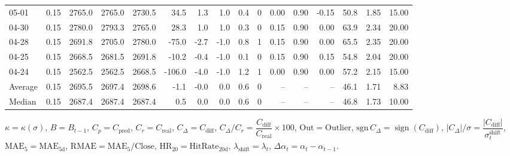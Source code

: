 \begin{threeparttable}
{\begin{tabular}{lrrrrrrrrrrrrrrr}
  05-01 &     0.15 & 2765.0 & 2765.0 & 2730.5 &       34.5 &            1.3 &                      1.0 &                 0.4 &              0 &       0.00 &      0.90 &          -0.15 &             50.8 &            1.85 &                  15.00 \\
  04-30 &     0.15 & 2780.0 & 2793.3 & 2765.0 &       28.3 &            1.0 &                      1.0 &                 0.3 &              0 &       0.15 &      0.90 &           0.00 &             63.9 &            2.34 &                  20.00 \\
  04-28 &     0.15 & 2691.8 & 2705.0 & 2780.0 &      -75.0 &           -2.7 &                     -1.0 &                 0.8 &              1 &       0.15 &      0.90 &           0.00 &             65.5 &            2.35 &                  20.00 \\
  04-25 &     0.15 & 2668.5 & 2681.5 & 2691.8 &      -10.2 &           -0.4 &                     -1.0 &                 0.1 &              0 &       0.15 &      0.90 &           0.15 &             54.8 &            2.04 &                  20.00 \\
  04-24 &     0.15 & 2562.5 & 2562.5 & 2668.5 &     -106.0 &           -4.0 &                     -1.0 &                 1.2 &              1 &       0.00 &      0.90 &           0.00 &             57.2 &            2.15 &                  15.00 \\
Average &     0.15 & 2695.5 & 2697.4 & 2698.6 &       -1.1 &           -0.0 &                      0.0 &                 0.6 &              0 &         -- &        -- &             -- &             46.1 &            1.71 &                   8.83 \\
 Median &     0.15 & 2687.4 & 2687.4 & 2687.4 &        0.5 &            0.0 &                      0.0 &                 0.6 &              0 &         -- &        -- &             -- &             46.8 &            1.73 &                  10.00 \\
\bottomrule
\end{tabular}
}
\begin{tablenotes}\footnotesize
\item $\kappa=\kappa(\sigma)$, $B=B_{t-1}$, $C_p=C_{\text{pred}}$, $C_r=C_{\text{real}}$, $C_\Delta=C_{\text{diff}}$, $C_\Delta/C_r=\dfrac{C_{\text{diff}}}{C_{\text{real}}}\times100$, $\mathrm{Out}=\text{Outlier}$, $\mathrm{sgn}\,C_\Delta=\operatorname{sign}(C_{\text{diff}})$, $|C_\Delta|/\sigma=\dfrac{|C_{\text{diff}}|}{\sigma_t^{\text{shift}}}$, $\mathrm{MAE}_5=\mathrm{MAE}_{5\text{d}}$, $\mathrm{RMAE}= \mathrm{MAE}_5 / \text{Close}$, $\mathrm{HR}_{20}=\mathrm{HitRate}_{20\text{d}}$, 
$\lambda_{\text{shift}}=\lambda_t$, 
$\Delta\alpha_t=\alpha_t-\alpha_{t-1}$.
\end{tablenotes}
\end{threeparttable}
\endgroup

